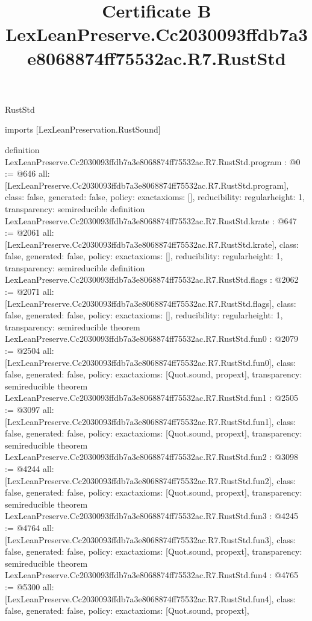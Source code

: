 \begin{lexlean}{RustStd}
\title{Certificate B LexLeanPreserve.Cc2030093ffdb7a3e8068874ff75532ac.R7.RustStd}
\begin{coremodule}
imports [LexLeanPreservation.RustSound]

definition LexLeanPreserve.Cc2030093ffdb7a3e8068874ff75532ac.R7.RustStd.program : @0 := @646 {
  all: [LexLeanPreserve.Cc2030093ffdb7a3e8068874ff75532ac.R7.RustStd.program],
  class: false,
  generated: false,
  policy: exact{axioms: []},
  reducibility: regular{height: 1},
  transparency: semireducible
}
definition LexLeanPreserve.Cc2030093ffdb7a3e8068874ff75532ac.R7.RustStd.krate : @647 := @2061 {
  all: [LexLeanPreserve.Cc2030093ffdb7a3e8068874ff75532ac.R7.RustStd.krate],
  class: false,
  generated: false,
  policy: exact{axioms: []},
  reducibility: regular{height: 1},
  transparency: semireducible
}
definition LexLeanPreserve.Cc2030093ffdb7a3e8068874ff75532ac.R7.RustStd.flags : @2062 := @2071 {
  all: [LexLeanPreserve.Cc2030093ffdb7a3e8068874ff75532ac.R7.RustStd.flags],
  class: false,
  generated: false,
  policy: exact{axioms: []},
  reducibility: regular{height: 1},
  transparency: semireducible
}
theorem LexLeanPreserve.Cc2030093ffdb7a3e8068874ff75532ac.R7.RustStd.fun0 : @2079 := @2504 {
  all: [LexLeanPreserve.Cc2030093ffdb7a3e8068874ff75532ac.R7.RustStd.fun0],
  class: false,
  generated: false,
  policy: exact{axioms: [Quot.sound, propext]},
  transparency: semireducible
}
theorem LexLeanPreserve.Cc2030093ffdb7a3e8068874ff75532ac.R7.RustStd.fun1 : @2505 := @3097 {
  all: [LexLeanPreserve.Cc2030093ffdb7a3e8068874ff75532ac.R7.RustStd.fun1],
  class: false,
  generated: false,
  policy: exact{axioms: [Quot.sound, propext]},
  transparency: semireducible
}
theorem LexLeanPreserve.Cc2030093ffdb7a3e8068874ff75532ac.R7.RustStd.fun2 : @3098 := @4244 {
  all: [LexLeanPreserve.Cc2030093ffdb7a3e8068874ff75532ac.R7.RustStd.fun2],
  class: false,
  generated: false,
  policy: exact{axioms: [Quot.sound, propext]},
  transparency: semireducible
}
theorem LexLeanPreserve.Cc2030093ffdb7a3e8068874ff75532ac.R7.RustStd.fun3 : @4245 := @4764 {
  all: [LexLeanPreserve.Cc2030093ffdb7a3e8068874ff75532ac.R7.RustStd.fun3],
  class: false,
  generated: false,
  policy: exact{axioms: [Quot.sound, propext]},
  transparency: semireducible
}
theorem LexLeanPreserve.Cc2030093ffdb7a3e8068874ff75532ac.R7.RustStd.fun4 : @4765 := @5300 {
  all: [LexLeanPreserve.Cc2030093ffdb7a3e8068874ff75532ac.R7.RustStd.fun4],
  class: false,
  generated: false,
  policy: exact{axioms: [Quot.sound, propext]},
}
\end{coremodule}
\end{lexlean}
